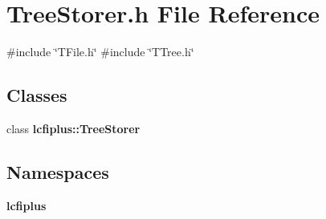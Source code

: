 \section{Tree\+Storer.\+h File Reference}
\label{TreeStorer_8h}
{\ttfamily \#include \char`\"{}T\+File.\+h\char`\"{}}\newline
{\ttfamily \#include \char`\"{}T\+Tree.\+h\char`\"{}}\newline
\subsection*{Classes}
\begin{DoxyCompactItemize}
\item 
class \textbf{ lcfiplus\+::\+Tree\+Storer}
\end{DoxyCompactItemize}
\subsection*{Namespaces}
\begin{DoxyCompactItemize}
\item 
 \textbf{ lcfiplus}
\end{DoxyCompactItemize}
